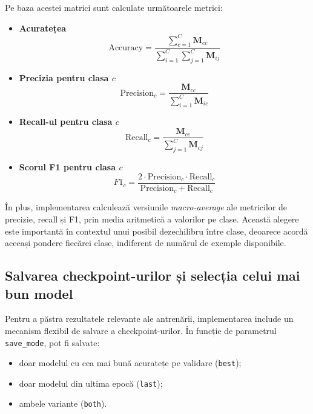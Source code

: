\documentclass[12pt,a4paper]{report}
\theoremstyle{definition}
\theoremstyle{remark}
\begin{document}
Pe baza acestei matrici sunt calculate următoarele metrici:
\begin{itemize}
    \item \textbf{Acuratețea}
    \begin{equation}
        \text{Accuracy} = \frac{\sum_{c=1}^{C} \mathbf{M}_{cc}}{\sum_{i=1}^{C}\sum_{j=1}^{C} \mathbf{M}_{ij}}
        \label{eq:accuracy}
    \end{equation}
    
    \item \textbf{Precizia pentru clasa $c$}
    \begin{equation}
        \text{Precision}_c = \frac{\mathbf{M}_{cc}}{\sum_{i=1}^{C} \mathbf{M}_{ic}}
        \label{eq:precision}
    \end{equation}
    
    \item \textbf{Recall-ul pentru clasa $c$}
    \begin{equation}
        \text{Recall}_c = \frac{\mathbf{M}_{cc}}{\sum_{j=1}^{C} \mathbf{M}_{cj}}
        \label{eq:recall}
    \end{equation}
    
    \item \textbf{Scorul F1 pentru clasa $c$}
    \begin{equation}
        F1_c = \frac{2 \cdot \text{Precision}_c \cdot \text{Recall}_c}{\text{Precision}_c + \text{Recall}_c}
        \label{eq:f1}
    \end{equation}
\end{itemize}

În plus, implementarea calculează versiunile \textit{macro-average} ale metricilor de precizie, recall și F1, prin media aritmetică a valorilor pe clase. Această alegere este importantă în contextul unui posibil dezechilibru între clase, deoarece acordă aceeași pondere fiecărei clase, indiferent de numărul de exemple disponibile.

\subsection{Salvarea checkpoint-urilor și selecția celui mai bun model}

Pentru a păstra rezultatele relevante ale antrenării, implementarea include un mecanism flexibil de salvare a checkpoint-urilor. În funcție de parametrul \texttt{save\_mode}, pot fi salvate:
\begin{itemize}
    \item doar modelul cu cea mai bună acuratețe pe validare (\texttt{best});
    \item doar modelul din ultima epocă (\texttt{last});
    \item ambele variante (\texttt{both}).
\end{itemize}
\end{document}
